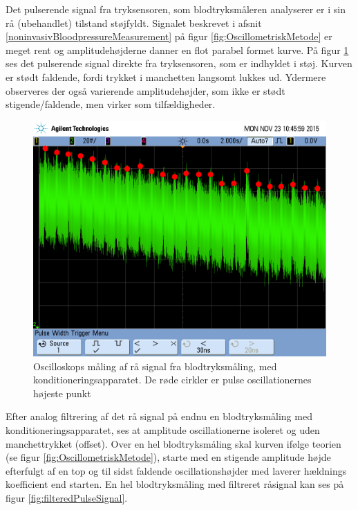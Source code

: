 Det pulserende signal fra tryksensoren, som blodtryksmåleren analyserer er i sin rå (ubehandlet) tilstand støjfyldt. Signalet beskrevet i afsnit \ref{noninvasivBloodpressureMeasurement} på figur \ref{fig:OscillometriskMetode} er meget rent og amplitudehøjderne danner en flot parabel formet kurve. På figur \ref{fig:rawPulseSignal} ses det pulserende signal direkte fra tryksensoren, som er indhyldet i støj. Kurven er stødt faldende, fordi trykket i manchetten langsomt lukkes ud. Ydermere observeres der også varierende amplitudehøjder, som ikke er stødt stigende/faldende, men virker som tilfældigheder.  

\begin{figure}[H]
	\centering
	\includegraphics[trim={0 7cm 0 1.5cm},clip, width=1\textwidth]{billeder/rawPulseSignalPeaks.png}
	\caption{Oscilloskops måling af rå signal fra blodtryksmåling, med konditioneringsapparatet. De røde cirkler er pulse oscillationernes højeste punkt}\label{fig:rawPulseSignal}
\end{figure}

Efter analog filtrering af det rå signal på endnu en blodtryksmåling med konditioneringsapparatet, ses at amplitude oscillationerne isoleret og uden manchettrykket (offset). Over en hel blodtryksmåling skal kurven ifølge teorien (se figur \ref{fig:OscillometriskMetode}), starte med en stigende amplitude højde efterfulgt af en top og til sidst faldende oscillationshøjder med laverer hældnings koefficient end starten. En hel blodtryksmåling med filtreret råsignal kan ses på figur \ref{fig:filteredPulseSignal}.

